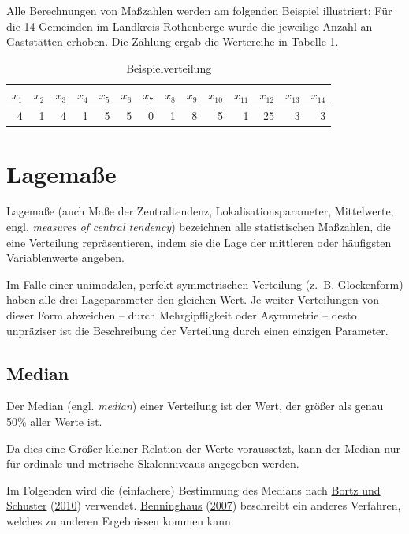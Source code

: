 \documentclass[
  11pt,
  ngerman,
  a4paper,
]{report}
\begin{document}
Alle Berechnungen von Maßzahlen werden am folgenden Beispiel illustriert: Für die 14 Gemeinden im Landkreis Rothenberge wurde die jeweilige Anzahl an Gaststätten erhoben. Die Zählung ergab die Wertereihe in Tabelle \ref{tab:werte}.

\begin{table}

\caption{\label{tab:werte}Beispielverteilung}
\centering
\begin{tabular}[t]{rrrrrrrrrrrrrr}
\toprule
$x_{1}$ & $x_{2}$ & $x_{3}$ & $x_{4}$ & $x_{5}$ & $x_{6}$ & $x_{7}$ & $x_{8}$ & $x_{9}$ & $x_{10}$ & $x_{11}$ & $x_{12}$ & $x_{13}$ & $x_{14}$\\
\midrule
4 & 1 & 4 & 1 & 5 & 5 & 0 & 1 & 8 & 5 & 1 & 25 & 3 & 3\\
\bottomrule
\end{tabular}
\end{table}

\hypertarget{lagemauxdfe}{%
\section{Lagemaße}\label{lagemauxdfe}}

Lagemaße (auch Maße der Zentraltendenz, Lokalisationsparameter, Mittelwerte, engl. \emph{measures of central tendency}) bezeichnen alle statistischen Maßzahlen, die eine Verteilung repräsentieren, indem sie die Lage der mittleren oder häufigsten Variablenwerte angeben.

Im Falle einer unimodalen, perfekt symmetrischen Verteilung (z.~B. Glockenform) haben alle drei Lageparameter den gleichen Wert. Je weiter Verteilungen von dieser Form abweichen -- durch Mehrgipfligkeit oder Asymmetrie -- desto unpräziser ist die Beschreibung der Verteilung durch einen einzigen Parameter.

\hypertarget{median}{%
\subsection{Median}\label{median}}

Der Median (engl. \emph{median}) einer Verteilung ist der Wert, der größer als genau 50\% aller Werte ist.

Da dies eine Größer-kleiner-Relation der Werte voraussetzt, kann der Median nur für ordinale und metrische Skalenniveaus angegeben werden.

Im Folgenden wird die (einfachere) Bestimmung des Medians nach \protect\hyperlink{ref-bortz}{Bortz und Schuster} (\protect\hyperlink{ref-bortz}{2010}) verwendet. \protect\hyperlink{ref-benninghaus}{Benninghaus} (\protect\hyperlink{ref-benninghaus}{2007}) beschreibt ein anderes Verfahren, welches zu anderen Ergebnissen kommen kann.
\end{document}
